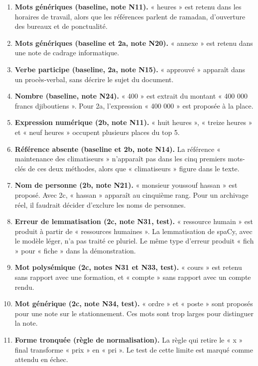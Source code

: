 \documentclass[11pt,a4paper]{article}
\begin{document}
\begin{enumerate}[itemsep=3pt]
\item \textbf{Mots génériques (baseline, note N11).} « heures » est retenu dans les horaires de travail, alors que les références parlent de ramadan, d'ouverture des bureaux et de ponctualité.
\item \textbf{Mots génériques (baseline et 2a, note N20).} « annexe » est retenu dans une note de cadrage informatique.
\item \textbf{Verbe participe (baseline, 2a, note N15).} « approuvé » apparaît dans un procès-verbal, sans décrire le sujet du document.
\item \textbf{Nombre (baseline, note N24).} « 400 » est extrait du montant « 400 000 francs djiboutiens ». Pour 2a, l'expression « 400 000 » est proposée à la place.
\item \textbf{Expression numérique (2b, note N11).} « huit heures », « treize heures » et « neuf heures » occupent plusieurs places du top 5.
\item \textbf{Référence absente (baseline et 2b, note N14).} La référence « maintenance des climatiseurs » n'apparaît pas dans les cinq premiers mots-clés de ces deux méthodes, alors que « climatiseurs » figure dans le texte.
\item \textbf{Nom de personne (2b, note N21).} « monsieur youssouf hassan » est proposé. Avec 2c, « hassan » apparaît au cinquième rang. Pour un archivage réel, il faudrait décider d'exclure les noms de personnes.
\item \textbf{Erreur de lemmatisation (2c, note N31, test).} « ressource humain » est produit à partir de « ressources humaines ». La lemmatisation de spaCy, avec le modèle léger, n'a pas traité ce pluriel. Le même type d'erreur produit « fich » pour « fiche » dans la démonstration.
\item \textbf{Mot polysémique (2c, notes N31 et N33, test).} « cours » est retenu sans rapport avec une formation, et « compte » sans rapport avec un compte rendu.
\item \textbf{Mot générique (2c, note N34, test).} « ordre » et « poste » sont proposés pour une note sur le stationnement. Ces mots sont trop larges pour distinguer la note.
\item \textbf{Forme tronquée (règle de normalisation).} La règle qui retire le « x » final transforme « prix » en « pri ». Le test de cette limite est marqué comme attendu en échec.
\end{enumerate}
\end{document}
